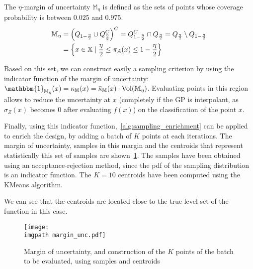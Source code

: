 \documentclass[../../Main_ManuscritThese.tex]{subfiles}
\newcommand\imgpath{/home/victor/acadwriting/Manuscrit/Text/Chapter4/img/}
\begin{document}
The $\eta$-margin of uncertainty $\mathbb{M}_{\eta}$ is defined as the sets of points whose coverage probability is between $0.025$ and $0.975$.
\begin{align}
  \label{eq:margin_unc}
  \mathbb{M}_{\eta} &= \left(Q_{1-\frac{\eta}{2}} \cup Q^C_{\frac{\eta}{2}} \right)^C = Q_{1-\frac{\eta}{2}}^C \cap Q_{\frac{\eta}{2}} = Q_{\frac{\eta}{2}} \setminus Q_{1-\frac{\eta}{2}} \\
                    &= \left\{x \in \mathbb{X} \mid \frac{\eta}{2} \leq \pi_A(x) \leq 1 - \frac{\eta}{2} \right\}
\end{align}

Based on this set, we can construct easily a sampling criterion by
using the indicator function of the margin of uncertainty:
$\mathbbm{1}_{\mathbb{M}_{\eta}}(x)=\kappa_{\mathbb{M}}(x) =
\bar{\kappa}_{\mathbb{M}}(x) \cdot \mathrm{Vol}(\mathbb{M}_{\eta})$.
 Evaluating points in this region allows to reduce
the uncertainty at $x$ (completely if the GP is interpolant, as
$\sigma_Z(x)$ becomes $0$ after evaluating $f(x)$) on the
classification of the point $x$.

Finally, using this indicator function,~\cref{alg:sampling_enrichment}
can be applied to enrich the design, by adding a batch of $K$ points
at each iterations.  The margin of uncertainty, samples
in this margin and the centroids that represent statistically this set
of samples are shown~\cref{fig:margin_unc}. The samples have been
obtained using an acceptance-rejection method, since the pdf of the
sampling distribution is an indicator function. The $K=\num{10}$
centroids have been computed using the KMeans algorithm.

We can see that the centroids are located close to the true level-set of the function in this case.
\begin{figure}[ht]
  \centering
  \texttt{[image: \\imgpath margin\_unc.pdf]}
  \caption[Samples in the margin of uncertainties and centroids]{\label{fig:margin_unc} Margin of uncertainty, and
    construction of the $K$ points of the batch to be evaluated, using
    samples and centroids}
\end{figure}

\end{document}
